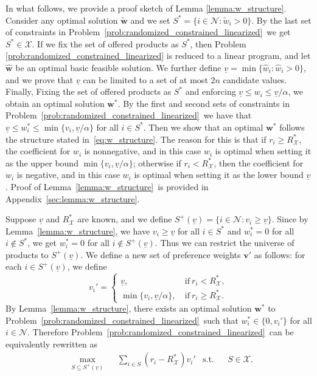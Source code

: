 \documentclass[mnsc,non-blindrev]{informs3}
\theoremstyle{definition}
\begin{document}
In what follows, we provide a proof sketch of Lemma \ref{lemma:w_structure}. Consider any optimal solution $\tilde{\bm{w}}$ and we set $S^*=\{i\in\mathcal{N}:\tilde{w}_i>0\}$. By the last set of constraints in Problem~\eqref{prob:randomized_constrained_linearized}~we get $S^*\in\mathcal{X}$. If we fix the set of offered products as $S^*$, then Problem \eqref{prob:randomized_constrained_linearized} is reduced to a linear program, and let $\hat{\bm{w}}$ be an optimal basic feasible solution. We further define $\underline{v}=\min\{\hat{w}_i:\hat{w}_i>0\}$, and we prove that $\underline{v}$ can be limited to a set of at most $2n$ candidate values. Finally, Fixing the set of offered products as $S^*$ and enforcing $\underline{v}\leq w_i\leq \underline{v}/\alpha$, we obtain an optimal solution $\bm{w}^*$. By the first and second sets of constraints in Problem~\eqref{prob:randomized_constrained_linearized}~we have that $\underline{v}\leq w_i^*\leq \min\{v_i,\underline{v}/\alpha\}$ for all $i\in S^*$. Then we show that an optimal $\bm{w}^*$ follows the structure stated in~\eqref{eq:w_structure}. The reason for this is that if $r_i\geq R^*_{\mathcal{X}}$, the coefficient for $w_i$ is nonnegative, and in this case $w_i$ is optimal when setting it as the upper bound $\min\{v_i,\underline{v}/\alpha\}$; otherwise if $r_i<R^*_{\mathcal{X}}$, then the coefficient for $w_i$ is negative, and in this case $w_i$ is optimal when setting it as the lower bound $\underline{v}$. Proof of Lemma~\ref{lemma:w_structure}~is provided in Appendix~\ref{sec:lemma:w_structure}.

Suppose $\underline{v}$ and $R^*_{\mathcal{X}}$ are known, and we define $S^+(\underline{v})=\{i\in\mathcal{N}:v_i\geq \underline{v}\}$. Since by Lemma~\ref{lemma:w_structure}, we have $v_i\geq \underline{v}$ for all $i\in S^*$ and $w_i^*=0$ for all $i\notin S^*$, we get $w_i^*=0$ for all $i\notin S^+(\underline{v})$. Thus we can restrict the universe of products to $S^+(\underline{v})$. We define a new set of preference weights $\bm{v}'$ as follows: for each $i\in S^+(\underline{v})$, we define
\begin{equation*}
v_i'=\begin{cases}
\underline{v},\ &\text{if}\ r_i<R_{\mathcal{X}}^*,\\
\min\{v_i,\underline{v}/\alpha\},\ &\text{if}\ r_i\geq R_{\mathcal{X}}^*.
\end{cases}
\end{equation*}
By Lemma~\ref{lemma:w_structure}, there exists an optimal solution $\bm{w}^*$ to Problem~\eqref{prob:randomized_constrained_linearized}~such that $w_i^*\in\{0,v_i'\}$ for all $i\in\mathcal{N}$. Therefore Problem~\eqref{prob:randomized_constrained_linearized}~can be equivalently rewritten as
\begin{equation}\label{prob:randomized_constrained_linearized_transformed}
\begin{aligned}
&\max_{S\subseteq S^+(\underline{v})}&&\sum_{i\in S}(r_i-R^*_{\mathcal{X}})v_i'&\text{s.t.}&& S\in\mathcal{X}.
\end{aligned}
\end{equation}
\end{document}
